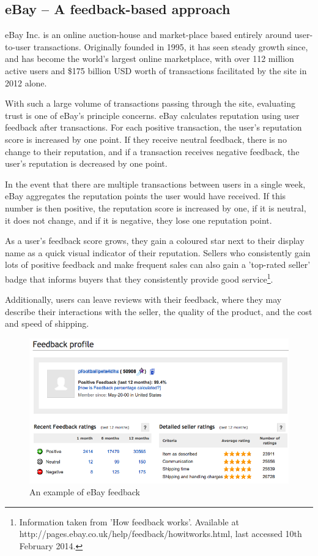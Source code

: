 \documentclass[]{final_report}
\begin{document}
\subsection{eBay -- A feedback-based approach}

eBay Inc. is an online auction-house and market-place based entirely around user-to-user transactions. Originally founded in 1995, it has seen steady growth since, and has become the world's largest online marketplace, with over 112 million active users and \$175 billion USD worth of transactions facilitated by the site in 2012 alone.

With such a large volume of transactions passing through the site, evaluating trust is one of eBay's principle concerns. eBay calculates reputation using user feedback after transactions. For each positive transaction, the user's reputation score is increased by one point. If they receive neutral feedback, there is no change to their reputation, and if a transaction receives negative feedback, the user's reputation is decreased by one point.

In the event that there are multiple transactions between users in a single week, eBay aggregates the reputation points the user would have received. If this number is then positive, the reputation score is increased by one, if it is neutral, it does not change, and if it is negative, they lose one reputation point.

As a user's feedback score grows, they gain a coloured star next to their display name as a quick visual indicator of their reputation. Sellers who consistently gain lots of positive feedback and make frequent sales can also gain a 'top-rated seller' badge that informs buyers that they consistently provide good service\footnote{Information taken from 'How feedback works'. Available at http://pages.ebay.co.uk/help/feedback/howitworks.html, last accessed 10th February 2014.}.

Additionally, users can leave reviews with their feedback, where they may describe their interactions with the seller, the quality of the product, and the cost and speed of shipping.

\begin{figure}[ht!]
\centering
\includegraphics[width=140mm]{ebayfeedback.PNG}
\caption{An example of eBay feedback}
\end{figure}
\end{document}

